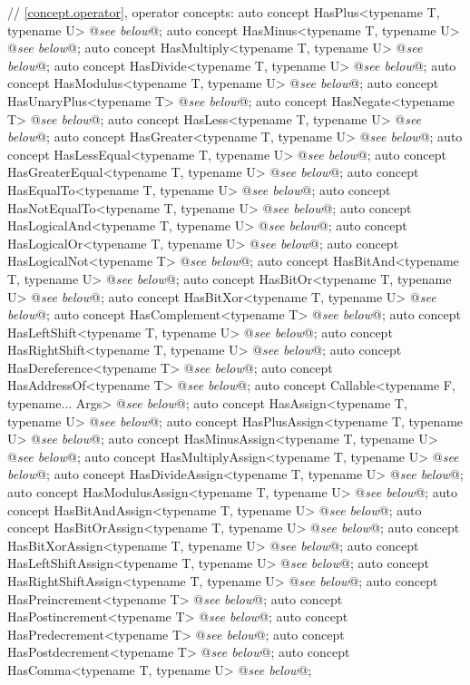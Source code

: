 \documentclass[american,twoside]{book}
\begin{document}
\begin{codeblock}
{  // \ref{concept.operator}, operator concepts:
  auto concept HasPlus<typename T, typename U> @\textit{see below}@;
  auto concept HasMinus<typename T, typename U> @\textit{see below}@;
  auto concept HasMultiply<typename T, typename U> @\textit{see below}@;
  auto concept HasDivide<typename T, typename U> @\textit{see below}@;
  auto concept HasModulus<typename T, typename U> @\textit{see below}@;
  auto concept HasUnaryPlus<typename T> @\textit{see below}@;
  auto concept HasNegate<typename T> @\textit{see below}@;
  auto concept HasLess<typename T, typename U> @\textit{see below}@;
  auto concept HasGreater<typename T, typename U> @\textit{see below}@;
  auto concept HasLessEqual<typename T, typename U> @\textit{see below}@;
  auto concept HasGreaterEqual<typename T, typename U> @\textit{see below}@;
  auto concept HasEqualTo<typename T, typename U> @\textit{see below}@;
  auto concept HasNotEqualTo<typename T, typename U> @\textit{see below}@;
  auto concept HasLogicalAnd<typename T, typename U> @\textit{see below}@;
  auto concept HasLogicalOr<typename T, typename U> @\textit{see below}@;
  auto concept HasLogicalNot<typename T> @\textit{see below}@;
  auto concept HasBitAnd<typename T, typename U> @\textit{see below}@;
  auto concept HasBitOr<typename T, typename U> @\textit{see below}@;
  auto concept HasBitXor<typename T, typename U> @\textit{see below}@;
  auto concept HasComplement<typename T> @\textit{see below}@;
  auto concept HasLeftShift<typename T, typename U> @\textit{see below}@;
  auto concept HasRightShift<typename T, typename U> @\textit{see below}@;
  auto concept HasDereference<typename T> @\textit{see below}@;
  auto concept HasAddressOf<typename T> @\textit{see below}@;
  auto concept Callable<typename F, typename... Args> @\textit{see below}@;
  auto concept HasAssign<typename T, typename U> @\textit{see below}@;
  auto concept HasPlusAssign<typename T, typename U> @\textit{see below}@;
  auto concept HasMinusAssign<typename T, typename U> @\textit{see below}@;
  auto concept HasMultiplyAssign<typename T, typename U> @\textit{see below}@;
  auto concept HasDivideAssign<typename T, typename U> @\textit{see below}@;
  auto concept HasModulusAssign<typename T, typename U> @\textit{see below}@;
  auto concept HasBitAndAssign<typename T, typename U> @\textit{see below}@;
  auto concept HasBitOrAssign<typename T, typename U> @\textit{see below}@;
  auto concept HasBitXorAssign<typename T, typename U> @\textit{see below}@;
  auto concept HasLeftShiftAssign<typename T, typename U> @\textit{see below}@;
  auto concept HasRightShiftAssign<typename T, typename U> @\textit{see below}@;
  auto concept HasPreincrement<typename T> @\textit{see below}@;
  auto concept HasPostincrement<typename T> @\textit{see below}@;
  auto concept HasPredecrement<typename T> @\textit{see below}@;
  auto concept HasPostdecrement<typename T> @\textit{see below}@;
  auto concept HasComma<typename T, typename U> @\textit{see below}@;

}
\end{codeblock}
\end{document}
